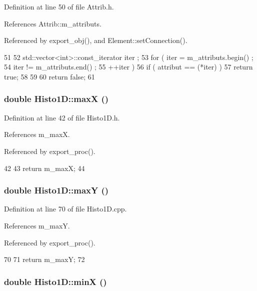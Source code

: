 Definition at line 50 of file Attrib.h.

References Attrib::m\_\-attributs.

Referenced by export\_\-obj(), and Element::setConnection().


\begin{DoxyCode}
51   {
52     std::vector<int>::const_iterator iter ;
53     for ( iter  = m_attributs.begin() ;
54           iter != m_attributs.end()   ;
55           ++iter ) {
56       if ( attribut == (*iter) ) {
57         return true;
58       }
59     }
60     return false;
61   }
\end{DoxyCode}
\hypertarget{classHisto1D_a54c7464513d1382c7c66fa880bfe568e}{
\subsubsection[{maxX}]{\setlength{\rightskip}{0pt plus 5cm}double Histo1D::maxX ()}}
\label{classHisto1D_a54c7464513d1382c7c66fa880bfe568e}


Definition at line 42 of file Histo1D.h.

References m\_\-maxX.

Referenced by export\_\-proc().


\begin{DoxyCode}
42                { 
43     return m_maxX; 
44   }
\end{DoxyCode}
\hypertarget{classHisto1D_a60a1095ac5fbab109d20c54c2ee569a3}{
\subsubsection[{maxY}]{\setlength{\rightskip}{0pt plus 5cm}double Histo1D::maxY ()}}
\label{classHisto1D_a60a1095ac5fbab109d20c54c2ee569a3}


Definition at line 70 of file Histo1D.cpp.

References m\_\-maxY.

Referenced by export\_\-proc().


\begin{DoxyCode}
70                     {
71   return m_maxY;
72 }
\end{DoxyCode}
\hypertarget{classHisto1D_abe9bf76799889414686794502e777b67}{
\subsubsection[{minX}]{\setlength{\rightskip}{0pt plus 5cm}double Histo1D::minX ()}}
\label{classHisto1D_abe9bf76799889414686794502e777b67}


